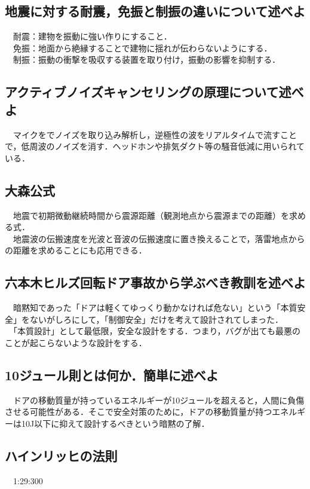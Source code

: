 \subsection{地震に対する耐震，免振と制振の違いについて述べよ}
　耐震：建物を振動に強い作りにすること．\\
　免振：地面から絶縁することで建物に揺れが伝わらないようにする．\\
　制振：振動の衝撃を吸収する装置を取り付け，振動の影響を抑制する．

\subsection{アクティブノイズキャンセリングの原理について述べよ}
　マイクをでノイズを取り込み解析し，逆極性の波をリアルタイムで流すことで，低周波のノイズを消す．ヘッドホンや排気ダクト等の騒音低減に用いられている．

\subsection{大森公式}
　地震で初期微動継続時間から震源距離（観測地点から震源までの距離）を求める式．\\
　地震波の伝搬速度を光波と音波の伝搬速度に置き換えることで，落雷地点からの距離を求めることにも応用できる．

\newpage
\subsection{六本木ヒルズ回転ドア事故から学ぶべき教訓を述べよ}
　暗黙知であった「ドアは軽くてゆっくり動かなければ危ない」という「本質安全」をないがしろにして，「制御安全」だけを考えて設計されてしまった．\\
　「本質設計」として最低限，安全な設計をする．つまり，バグが出ても最悪のことが起こらないような設計をする．

\subsection{10ジュール則とは何か．簡単に述べよ}
　ドアの移動質量が持っているエネルギーが10ジュールを超えると，人間に負傷させる可能性がある．そこで安全対策のために，ドアの移動質量が持つエネルギーは10J以下に抑えて設計するべきという暗黙の了解．

\subsection{ハインリッヒの法則}
　1:29:300

\vspace{7cm}


